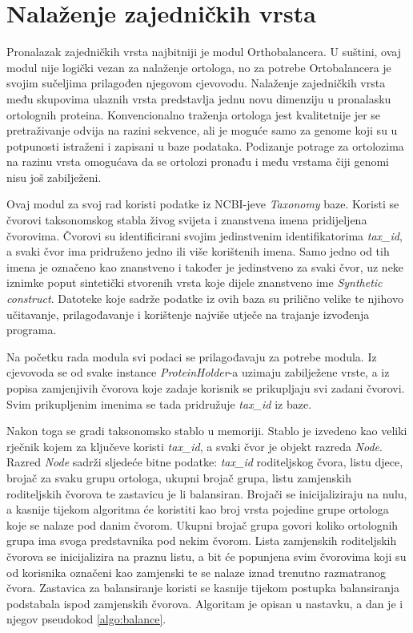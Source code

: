 \chapter{Nalaženje zajedničkih vrsta}
\label{chap:tax}

Pronalazak zajedničkih vrsta najbitniji je modul Orthobalancera. U suštini, ovaj
modul nije logički vezan za nalaženje ortologa, no za potrebe Ortobalancera je
svojim sučeljima prilagođen njegovom cjevovodu. Nalaženje zajedničkih vrsta među
skupovima ulaznih vrsta predstavlja jednu novu dimenziju u pronalasku ortolognih
proteina. Konvencionalno traženja ortologa \cite{bharatham2011determinants,
tatusov1997genomic} jest kvalitetnije jer se pretraživanje odvija na razini
sekvence, ali je moguće samo za genome koji su u potpunosti istraženi i zapisani
u baze podataka.\cite{flicek2011ensembl} Podizanje potrage za ortolozima na
razinu vrsta omogućava da se ortolozi pronađu i među vrstama čiji genomi nisu
još zabilježeni.

Ovaj modul za svoj rad koristi podatke iz NCBI-jeve \emph{Taxonomy} baze.
Koristi se čvorovi taksonomskog stabla živog svijeta i znanstvena imena
pridijeljena čvorovima. Čvorovi su identificirani svojim jedinstvenim
identifikatorima \emph{tax\_id}, a svaki čvor ima pridruženo jedno ili više
korištenih imena. Samo jedno od tih imena je označeno kao znanstveno i također
je jedinstveno za svaki čvor, uz neke iznimke poput sintetički stvorenih vrsta
koje dijele znanstveno ime \emph{Synthetic construct}. Datoteke koje sadrže
podatke iz ovih baza su prilično velike te njihovo učitavanje, prilagođavanje i
korištenje najviše utječe na trajanje izvođenja programa.

Na početku rada modula svi podaci se prilagođavaju za potrebe modula. Iz
cjevovoda se od svake instance \emph{ProteinHolder}-a uzimaju zabilježene vrste,
a iz popisa zamjenjivih čvorova koje zadaje korisnik se prikupljaju svi zadani
čvorovi. Svim prikupljenim imenima se tada pridružuje \emph{tax\_id} iz baze.

Nakon toga se gradi taksonomsko stablo u memoriji. Stablo je izvedeno kao veliki
rječnik kojem za ključeve koristi \emph{tax\_id}, a svaki čvor je objekt razreda
\emph{Node}. Razred \emph{Node} sadrži sljedeće bitne podatke: \emph{tax\_id}
roditeljskog čvora, listu djece, brojač za svaku grupu ortologa, ukupni brojač
grupa, listu zamjenskih roditeljskih čvorova te zastavicu je li balansiran.
Brojači se inicijaliziraju na nulu, a kasnije tijekom algoritma će koristiti kao
broj vrsta pojedine grupe ortologa koje se nalaze pod danim čvorom. Ukupni
brojač grupa govori koliko ortolognih grupa ima svoga predstavnika pod nekim
čvorom. Lista zamjenskih roditeljskih čvorova se inicijalizira na praznu listu,
a bit će popunjena svim čvorovima koji su od korisnika označeni kao zamjenski te
se nalaze iznad trenutno razmatranog čvora. Zastavica za balansiranje koristi se
kasnije tijekom postupka balansiranja podstabala ispod zamjenskih čvorova.
Algoritam je opisan u nastavku, a dan je i njegov pseudokod \ref{algo:balance}.

